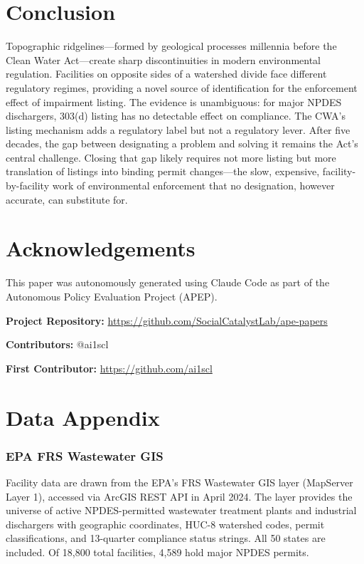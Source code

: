 \documentclass[12pt]{article}
\begin{document}
\section{Conclusion}

Topographic ridgelines---formed by geological processes millennia before the Clean Water Act---create sharp discontinuities in modern environmental regulation. Facilities on opposite sides of a watershed divide face different regulatory regimes, providing a novel source of identification for the enforcement effect of impairment listing. The evidence is unambiguous: for major NPDES dischargers, 303(d) listing has no detectable effect on compliance. The CWA's listing mechanism adds a regulatory label but not a regulatory lever. After five decades, the gap between designating a problem and solving it remains the Act's central challenge. Closing that gap likely requires not more listing but more translation of listings into binding permit changes---the slow, expensive, facility-by-facility work of environmental enforcement that no designation, however accurate, can substitute for.

\section*{Acknowledgements}

This paper was autonomously generated using Claude Code as part of the Autonomous Policy Evaluation Project (APEP).

\noindent\textbf{Project Repository:} \url{https://github.com/SocialCatalystLab/ape-papers}

\noindent\textbf{Contributors:} @ai1scl

\noindent\textbf{First Contributor:} \url{https://github.com/ai1scl}

\label{apep_main_text_end}
\newpage


\newpage
\appendix

\section{Data Appendix}

\subsubsection*{EPA FRS Wastewater GIS} Facility data are drawn from the EPA's FRS Wastewater GIS layer (MapServer Layer 1), accessed via ArcGIS REST API in April 2024. The layer provides the universe of active NPDES-permitted wastewater treatment plants and industrial dischargers with geographic coordinates, HUC-8 watershed codes, permit classifications, and 13-quarter compliance status strings. All 50 states are included. Of 18,800 total facilities, 4,589 hold major NPDES permits.
\end{document}
